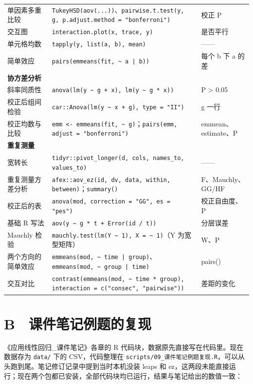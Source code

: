 \begin{tabular}{p{3.3cm}p{6.6cm}p{4.6cm}}
单因素多重比较 & \Verb|TukeyHSD(aov(...))|、\Verb|pairwise.t.test(y, g, p.adjust.method = "bonferroni")| & 校正 P\\
交互图 & \Verb|interaction.plot(x, trace, y)| & 是否平行\\
单元格均数 & \Verb|tapply(y, list(a, b), mean)| & ——\\
简单效应 & \Verb!pairs(emmeans(fit, ~ a | b))! & 每个 b 下 a 的差\\
\midrule
\multicolumn{3}{l}{\textbf{协方差分析}}\\
斜率同质性 & \Verb|anova(lm(y ~ g + x), lm(y ~ g * x))| & P > 0.05\\
校正后组间检验 & \Verb|car::Anova(lm(y ~ x + g), type = "II")| & g 一行\\
校正均数与比较 & \Verb|emm <- emmeans(fit, ~ g)|；\Verb|pairs(emm, adjust = "bonferroni")| & emmean、estimate、P\\
\midrule
\multicolumn{3}{l}{\textbf{重复测量}}\\
宽转长 & \Verb|tidyr::pivot_longer(d, cols, names_to, values_to)| & ——\\
重复测量方差分析 & \Verb|afex::aov_ez(id, dv, data, within, between)|；\Verb|summary()| & F、Mauchly、GG/HF\\
校正后的表 & \Verb|anova(mod, correction = "GG", es = "pes")| & 校正自由度、P\\
基础 R 写法 & \Verb|aov(y ~ g * t + Error(id / t))| & 分层误差\\
Mauchly 检验 & \Verb|mauchly.test(lm(Y ~ 1), X = ~ 1)|（Y 为宽型矩阵） & W、P\\
两个方向的简单效应 & \Verb!emmeans(mod, ~ time | group)!、\Verb!emmeans(mod, ~ group | time)! & pairs()\\
交互对比 & \Verb|contrast(emmeans(mod, ~ time * group), interaction = c("consec", "pairwise"))| & 差距的变化\\
\bottomrule
\end{tabular}



\section{B　课件笔记例题的复现}
\label{app:notes}
《应用线性回归\_课件笔记》各章的 R 代码块，数据原先直接写在代码里。现在数据存为 \Verb|data/| 下的 CSV，代码整理在 \Verb|scripts/09_课件笔记例题复现.R|，可以从头跑到尾。笔记修订记录中提到当时本机没装 leaps 和 ez，这两段未能直接运行；现在两个包都已安装，全部代码块均已运行，结果与笔记给出的数值一致：


